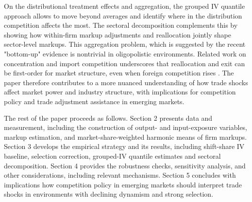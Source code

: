 \documentclass[12pt]{article}
\begin{document}
On the distributional treatment effects and aggregation, the grouped IV quantile approach \parencite{chetverikovIVQuantileRegression2016} allows to move beyond averages and identify where in the distribution competition affects the most. The sectoral decomposition complements this by showing how within-firm markup adjustments and reallocation jointly shape sector-level markups. This aggregation problem, which is suggested by the recent "bottom-up" evidence \parencite{bursteinBottomUpMarkupFluctuations2025} is nontrivial in oligopolistic environments. Related work on concentration and import competition \parencite{autorFallLaborShare2020,baqaeeProductivityMisallocationGeneral2020} underscores that reallocation and exit can be first-order for market structure, even when foreign competition rises \parencite{amitiUSMarketConcentration2025}. The paper therefore contributes to a more nuanced understanding of how trade shocks affect market power and industry structure, with implications for competition policy and trade adjustment assistance in emerging markets.

The rest of the paper proceeds as follows. Section 2 presents data and measurement, including the construction of output- and input-exposure variables, markup estimation, and market-share-weighted harmonic means of firm markups. Section 3 develops the empirical strategy and its results, including shift-share IV baseline, selection correction, grouped-IV quantile estimates and sectoral decomposition. Section 4 provides the robustness checks, sensitivity analysis, and other considerations, including relevant mechanisms. Section 5 concludes with implications how competition policy in emerging markets should interpret trade shocks in environments with declining dynamism and strong selection.



\printbibliography
\end{document}
